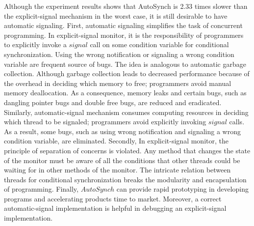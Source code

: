 \documentclass[preprint]{sigplanconf}
\begin{document}
Although the experiment results shows that AutoSynch is 2.33 times slower than 
the explicit-signal mechanism in the worst case, it is still desirable to have automatic signaling.
First, automatic signaling simplifies the task of concurrent programming.
            In explicit-signal monitor, it is the responsibility of programmers to 
        explicitly invoke a $signal$ call on some condition variable for
        conditional synchronization. Using the wrong notification or signaling
        a wrong condition variable are frequent source of bugs.  The idea is analogous to automatic
        garbage collection.
Although garbage collection leads to decreased
performance because of the overhead in deciding which memory to free; programmers 
avoid manual memory deallocation. As a consequence, memory leaks and certain 
bugs, such as dangling pointer bugs and double free bugs, are reduced and 
eradicated. Similarly, automatic-signal mechanism consumes computing resources 
in deciding which thread to be signaled; programmers avoid explicitly invoking 
$signal$ calls. As a result, some bugs, such as using wrong notification and
signaling a wrong condition variable, are eliminated.  Secondly,
 In explicit-signal monitor, the principle of separation of concerns is violated.
    Any method that changes the state of the monitor must be aware of all the conditions that other threads could be waiting for 
    in other methods of the monitor. 
     The intricate relation between
        threads for conditional synchronization breaks the modularity and 
        encapsulation of programming.  
   Finally,
  $AutoSynch$ can provide  
        rapid prototyping  in developing programs and accelerating 
        products time to market. Moreover, 
        a correct
        automatic-signal implementation is helpful in debugging an
        explicit-signal implementation. 



\end{document}

